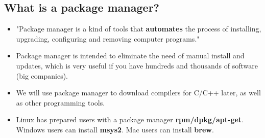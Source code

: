 \documentclass[11pt]{exam}
\begin{document}
\subsection{What is a package manager?}
\begin{itemize}
    \item "Package manager is a kind of tools that \textbf{automates} the process of installing, upgrading, configuring and removing computer programs."\cite{ref4}
    \item Package manager is intended to eliminate the need of manual install and updates, which is very useful if you have hundreds and thousands of software (big companies).
    \item We will use package manager to download compilers for C/C++ later, as well as other programming tools.
    \item Linux has prepared users with a package manager \textbf{rpm/dpkg/apt-get}. Windows users can install \textbf{msys2}. Mac users can install \textbf{brew}.
\end{itemize}
\end{document}

